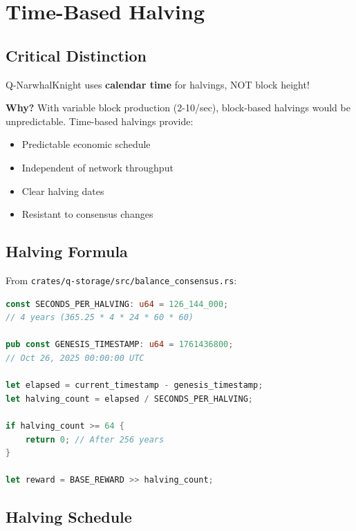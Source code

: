 \documentclass[11pt,a4paper]{article}
\begin{document}
\section{Time-Based Halving}

\subsection{Critical Distinction}

\begin{tcolorbox}[colback=accentcolor!20, colframe=accentcolor, title=Time-Based Halving (NOT Block-Based!)]
Q-NarwhalKnight uses \textbf{calendar time} for halvings, NOT block height!

\textbf{Why?} With variable block production (2-10/sec), block-based halvings would be unpredictable. Time-based halvings provide:
\begin{itemize}
    \item Predictable economic schedule
    \item Independent of network throughput
    \item Clear halving dates
    \item Resistant to consensus changes
\end{itemize}
\end{tcolorbox}

\subsection{Halving Formula}

From \texttt{crates/q-storage/src/balance\_consensus.rs}:

\begin{lstlisting}[language=Rust]
const SECONDS_PER_HALVING: u64 = 126_144_000;
// 4 years (365.25 * 4 * 24 * 60 * 60)

pub const GENESIS_TIMESTAMP: u64 = 1761436800;
// Oct 26, 2025 00:00:00 UTC

let elapsed = current_timestamp - genesis_timestamp;
let halving_count = elapsed / SECONDS_PER_HALVING;

if halving_count >= 64 {
    return 0; // After 256 years
}

let reward = BASE_REWARD >> halving_count;
\end{lstlisting}

\subsection{Halving Schedule}
\end{document}
